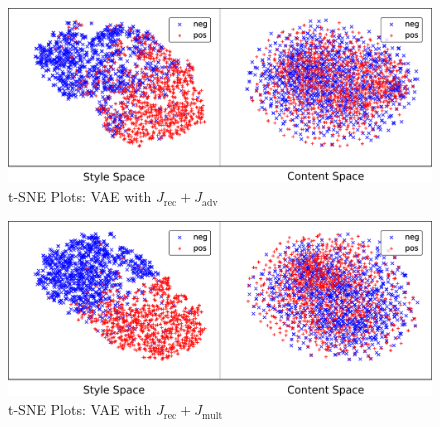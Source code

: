 \documentclass[letterpaper]{article} %
\newcommand{\loss}[1]{J_\text{#1}}
\begin{document}
\begin{figure}[h]
	\captionsetup{justification=centering}
	\includegraphics[width=\linewidth]{vae-latent-spaces-rec-adv}
	\caption{t-SNE Plots: VAE with $\loss{rec} + \loss{adv}$}
	\label{fig:vae-tsne-rec-adv}
\end{figure}

\begin{figure}[h]
	\captionsetup{justification=centering}
	\includegraphics[width=\linewidth]{vae-latent-spaces-rec-mult}
	\caption{t-SNE Plots: VAE with $\loss{rec} + \loss{mult}$}
	\label{fig:vae-tsne-rec-mult}
\end{figure}
\end{document}
